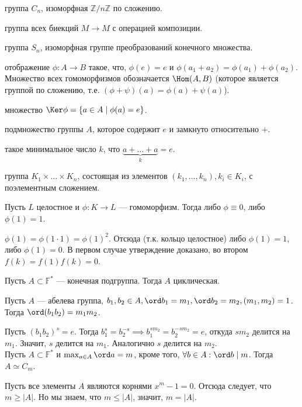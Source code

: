\documentclass[12pt,a4paper]{article}
\begin{document}
 группа $C_n$, изоморфная $\mathbb Z /n\mathbb Z $ по сложению.

 группа всех биекций $M\to M$ с операцией композиции.

 группа $S_n$, изоморфная группе преобразований конечного множества.

 отображение $\phi:A\to B$ такое, что, $\phi(e)=e$ и $\phi(a_1+a_2)=\phi(a_1)+\phi(a_2)$. Множество всех гомоморфизмов обозначается $\Hom(A,B)$ (которое является группой по сложению, т.е. $(\phi+\psi)(a)=\phi(a)+\psi(a)$).

 множество $\Ker\phi=\{a\in A\mid \phi(a)=e\}$.

 подмножество группы $A$, которое содержит $e$ и замкнуто относительно $+$.

 такое минимальное число $k$, что $\underbrace{a+\ldots +a}_k=e$.

 группа $K_1\times \ldots \times K_n$, состоящая из элементов $(k_1,\ldots ,k_n),k_i\in K_i$, с поэлементным сложением.

\lemma Пусть $L$ целостное и $\phi:K\to L$ --- гомоморфизм. Тогда либо $\phi\equiv 0$, либо $\phi(1)=1$.

\proof $\phi(1)=\phi(1\cdot 1)=\phi(1)^2$. Отсюда (т.к. кольцо целостное) либо $\phi(1)=1$, либо $\phi(1)=0$. В первом случае утверждение доказано, во втором $f(k)=f(1)f(k)=0$.\QEDA\\
\newpage 

\theorem Пусть $A\subset \mathbb F^*$ --- конечная подгруппа. Тогда $A$ циклическая.\label{primitive}

\lemma Пусть $A$ --- абелева группа, $b_1,b_2\in A,\ord b_1=m_1,\ord b_2=m_2,(m_1,m_2)=1$. Тогда $\ord(b_1b_2)=m_1m_2$.

\proof Пусть $(b_1b_2)^s=e$. Тогда $b_1^s=b_2^{-s}\implies b_1^{sm_2}=b_2^{-sm_2}=e$, откуда $sm_2$ делится на $m_1$. Значит, $s$ делится на $m_1$. Аналогично $s$ делится на $m_2$. \QEDA\\

\lemma Пусть $A\subset \mathbb F ^*$ и $\max_{a\in A}\ord a=m$, кроме того, $\forall b\in A:\ord b\mid m$. Тогда $A\simeq C_m$.

\proof Пусть все элементы $A$ являются корнями $x^m-1=0$. Отсюда следует, что $m\geq |A|$. Но мы знаем, что $m\leq |A|$, значит, $m=|A|$.
\end{document}
